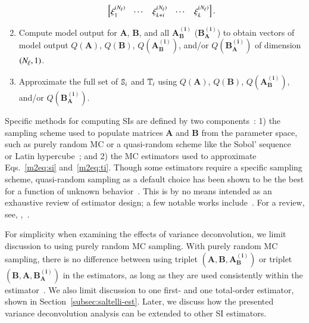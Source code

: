 \begin{enumerate}
\begin{equation}
\begin{bmatrix}
        \xi_1^{(\Nxi)} & \cdots & \xi_{k+i}^{(\Nxi)}   & \cdots & \xi_k^{(\Nxi)}  \\
        \end{bmatrix} .
    \end{equation}
    \item Compute model output for $\bm{A}$, $\bm{B}$, and all $\bm{A_B^{(i)}}$ ($\bm{B_A^{(i)}}$) to obtain vectors of model output $Q(\bm{A})$, $Q(\bm{B})$, $Q(\bm{A_B^{(i)}})$, and/or $Q(\bm{B_A^{(i)}})$ of dimension $(\Nxi,1)$. 
    \item Approximate the full set of $\S{i}$ and $\T{i}$ using $Q(\bm{A})$, $Q(\bm{B})$, $Q(\bm{A_B^{(i)}})$, and/or $Q(\bm{B_A^{(i)}})$.
\end{enumerate}
Specific methods for computing SIs are defined by two components~\cite{piano-etal-2021}: 1) the sampling scheme used to populate matrices $\bm{A}$ and $\bm{B}$ from the parameter space, such as purely random MC or a quasi-random scheme like the Sobol' sequence~\cite{sobol-1967, sobol-1976} or Latin hypercube~\cite{mckay-etal-1979}; and 2) the MC estimators used to approximate Eqs.~\eqref{m2eq:si} and~\eqref{m2eq:ti}. 
Though some estimators require a specific sampling scheme, quasi-random sampling as a default choice has been shown to be the best for a function of unknown behavior~\cite{kucherenko-etal-2015, sensobol-2022}.
This is by no means intended as an exhaustive review of estimator design; a few notable works include~\cite{saltelli-etal-2008, sobol-1993, homma-saltelli-1996, saltelli-2002, saltelli-etal-2010, glen-isaacs-2012, janon-etal-2014, lilburne-tarantola-2009, mara-joseph-2008, mckay-1995, owen-2013, plischke-etal-2013, ratto-etal-2007, sobol-etal-2007, jansen-1999, azzini-etal-2020b, sobol-2001, monod-etal-2006, razavi-gupta-2016a, razavi-gupta-2016b}. 
For a review, see, \eg,~\cite{puy-etal-2022, saltelli-etal-2010}.

For simplicity when examining the effects of variance deconvolution, we limit discussion to using purely random MC sampling. 
With purely random MC sampling, there is no difference between using triplet $\left( \bm{A}, \bm{B}, \bm{A_B^{(i)}} \right)$ or triplet $\left( \bm{B}, \bm{A}, \bm{B_A^{(i)}} \right)$ in the estimators, as long as they are used consistently within the estimator~\cite{saltelli-etal-2010}.
We also limit discussion to one first- and one total-order estimator, shown in Section~\ref{subsec:saltelli-est}. 
Later, we discuss how the presented variance deconvolution analysis can be extended to other SI estimators. 

